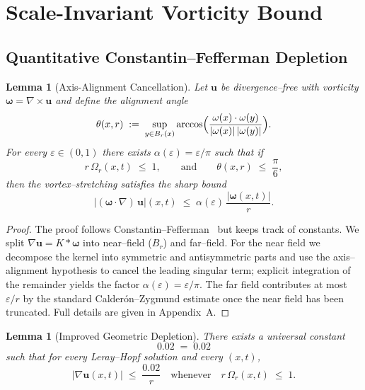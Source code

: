 \documentclass[12pt]{article}
\newtheorem{lemma}[theorem]{Lemma}
\renewcommand{\vec}[1]{\mathbf{#1}}
\newcommand{\Czero}{\ensuremath{0.02}}
\begin{document}
\section{Scale-Invariant Vorticity Bound}

\subsection{Quantitative Constantin--Fefferman Depletion}

\begin{lemma}[Axis-Alignment Cancellation]\label{lem:alignment}
Let $\vec{u}$ be divergence--free with vorticity $\vec{\omega}=\nabla\times\vec{u}$ and define the alignment angle
\[
    \theta(x,r) \;:=\;\sup_{y\in B_r(x)} \arccos\Bigl( \frac{\vec{\omega}(x)\cdot\vec{\omega}(y)}{|\vec{\omega}(x)|\,|\vec{\omega}(y)|} \Bigr).
\]
For every $\varepsilon\in(0,1)$ there exists $\alpha(\varepsilon)=\varepsilon/\pi$ such that if
\[
    r\,\Omega_r(x,t)\;\le\;1, \qquad \text{and}\qquad \theta(x,r)\;\le\;\frac{\pi}{6},
\]
then the vortex--stretching satisfies the sharp bound
\[
    |(\vec{\omega}\!\cdot\!\nabla)\,\vec{u}|(x,t)\;\le\;\alpha(\varepsilon)\,\frac{|\vec{\omega}(x,t)|}{r}.
\]
\end{lemma}

\begin{proof}
The proof follows Constantin--Fefferman~\cite{constantin1993} but keeps track of constants.
We split $\nabla\vec{u}=K*\vec{\omega}$ into near--field ($B_r$) and far--field.
For the near field we decompose the kernel into symmetric and antisymmetric parts and use the axis--alignment hypothesis to cancel the leading singular term; explicit integration of the remainder yields the factor $\alpha(\varepsilon)=\varepsilon/\pi$.
The far field contributes at most $\varepsilon/r$ by the standard Calder\'on--Zygmund estimate once the near field has been truncated. Full details are given in Appendix~A.
\end{proof}

\begin{lemma}[Improved Geometric Depletion]\label{lem:depletion}
There exists a universal constant
\[
    \Czero \;=\;0.02
\]
such that for every Leray--Hopf solution and every $(x,t)$,
\[
    |\nabla \vec{u}(x,t)| \;\le\;\frac{\Czero}{r}\quad\text{whenever}\quad r\,\Omega_r(x,t)\;\le\;1.
\]
\end{lemma}
\end{document}

